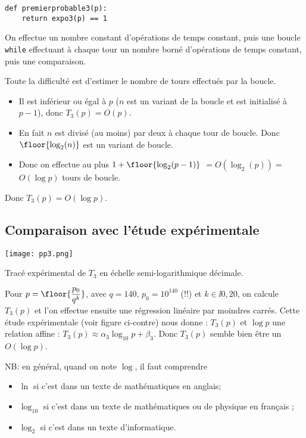 \begin{lstlisting}
def premierprobable3(p):
    return expo3(p) == 1
\end{lstlisting}


On effectue un nombre constant d'opérations de temps constant, puis
une boucle \lstinline{while} effectuant à chaque tour un nombre borné
d'opérations de temps constant, puis une comparaison.

Toute la difficulté est d'estimer le nombre de tours effectués par la
boucle.
\begin{itemize}
\item Il est inférieur ou égal à $p$ ($n$ est un variant de la
  boucle et est initialisé à $p-1$), donc $T_{3}(p)=O(p)$.
\item En fait $n$
  est divisé (au moins) par deux à chaque tour de boucle. Donc
  $\floor{\log_{2}(n)}$ est un variant de boucle.
\item Donc on effectue au
  plus $1+ \floor{\log_{2}(p-1)}$ $= O(\log_{2}(p)) =$ $ O(\log p)$ tours de boucle.
\end{itemize}
Donc $T_{3}(p) = O(\log p)$.


\subsection{Comparaison avec l'étude expérimentale}


  \begin{marginfigure}
    \texttt{[image: pp3.png]}
    \caption{Tracé expérimental de $T_3$ en échelle semi-logarithmique décimale.}
   \label{fig.pp3}
  \end{marginfigure}
Pour $p = \floor{\dfrac{p_0}{q^k}}$, avec $q = 140$, $p_0 = 10^{140}$ (!!) et $k\in\ii{0,20}$, on calcule $T_3(p)$ et l'on effectue ensuite une régression linéaire par moindres carrés. Cette étude expérimentale 
(voir figure ci-contre) 
nous donne :
$T_{3}(p)$ et $\log p$ une relation affine :
$  T_{3}(p) \approx \alpha_{3}\log_{10} p + \beta_{3}$. Donc $T_{3}(p)$ semble bien être un $O(\log p)$.

NB: en général, quand on note $\log$, il faut comprendre
\begin{itemize}
\item $\ln$ si c'est dans un texte de mathématiques en anglais;
\item $\log_{10}$ si c'est dans un texte de mathématiques ou de
  physique en français ;
\item $\log_{2}$ si c'est dans un texte d'informatique.
\end{itemize}



